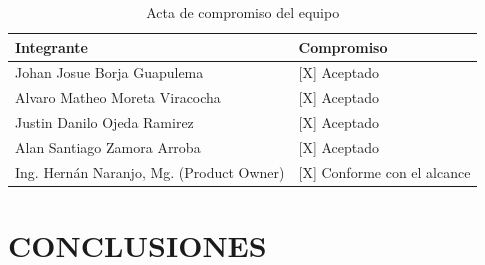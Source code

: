 \documentclass[11pt,a4paper]{article}
\newcommand{\hd}[1]{\textbf{#1}}
\begin{document}
\begin{table}[H]
\centering\small
\caption{Acta de compromiso del equipo}
\begin{tabularx}{\textwidth}{|Y|R{5.6cm}|}
\hline
\hd{Integrante} & \hd{Compromiso}\\ \hline
Johan Josue Borja Guapulema & [X] Aceptado\\ \hline
Alvaro Matheo Moreta Viracocha & [X] Aceptado\\ \hline
Justin Danilo Ojeda Ramirez & [X] Aceptado\\ \hline
Alan Santiago Zamora Arroba & [X] Aceptado\\ \hline
Ing. Hernán Naranjo, Mg. (Product Owner) & [X] Conforme con el alcance\\ \hline
\end{tabularx}
\end{table}

\section{CONCLUSIONES}
\end{document}
